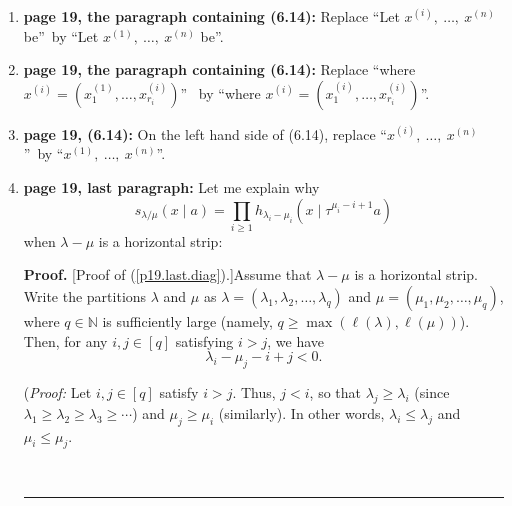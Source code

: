 \documentclass[numbers=enddot,12pt,final,onecolumn,notitlepage]{scrartcl}%
\theoremstyle{definition}
\newenvironment{proof}[1][Proof]{\noindent\textbf{#1.} }{\ \rule{0.5em}{0.5em}}
\let\prodnonlimits\prod
\renewcommand{\prod}{\prodnonlimits\limits}
\begin{document}
\begin{enumerate}
\item \textbf{page 19, the paragraph containing (6.14):} Replace
\textquotedblleft Let $x^{\left(  i\right)  },\ \ldots,\ x^{\left(  n\right)
}$ be\textquotedblright\ by \textquotedblleft Let $x^{\left(  1\right)
},\ \ldots,\ x^{\left(  n\right)  }$ be\textquotedblright.

\item \textbf{page 19, the paragraph containing (6.14):} Replace
\textquotedblleft where $x^{\left(  i\right)  }=\left(  x_{1}^{\left(
1\right)  },\ldots,x_{r_{i}}^{\left(  i\right)  }\right)  $\textquotedblright%
\ by \textquotedblleft where $x^{\left(  i\right)  }=\left(  x_{1}^{\left(
i\right)  },\ldots,x_{r_{i}}^{\left(  i\right)  }\right)  $\textquotedblright.

\item \textbf{page 19, (6.14):} On the left hand side of (6.14), replace
\textquotedblleft$x^{\left(  i\right)  },\ \ldots,\ x^{\left(  n\right)  }%
$\textquotedblright\ by \textquotedblleft$x^{\left(  1\right)  }%
,\ \ldots,\ x^{\left(  n\right)  }$\textquotedblright.

\item \textbf{page 19, last paragraph:} Let me explain why
\begin{equation}
s_{\lambda/\mu}\left(  x\mid a\right)  =\prod_{i\geq1}h_{\lambda_{i}-\mu_{i}%
}\left(  x\mid\tau^{\mu_{i}-i+1}a\right)  \label{p19.last.diag}%
\end{equation}
when $\lambda-\mu$ is a horizontal strip:

\begin{proof}
[Proof of (\ref{p19.last.diag}).]Assume that $\lambda-\mu$ is a horizontal
strip. Write the partitions $\lambda$ and $\mu$ as $\lambda=\left(
\lambda_{1},\lambda_{2},\ldots,\lambda_{q}\right)  $ and $\mu=\left(  \mu
_{1},\mu_{2},\ldots,\mu_{q}\right)  $, where $q\in\mathbb{N}$ is sufficiently
large (namely, $q\geq\max\left(  \ell\left(  \lambda\right)  ,\ell\left(
\mu\right)  \right)  $). Then, for any $i,j\in\left[  q\right]  $ satisfying
$i>j$, we have%
\begin{equation}
\lambda_{i}-\mu_{j}-i+j<0. \label{p19.last.pf.1}%
\end{equation}


(\textit{Proof:} Let $i,j\in\left[  q\right]  $ satisfy $i>j$. Thus, $j<i$, so
that $\lambda_{j}\geq\lambda_{i}$ (since $\lambda_{1}\geq\lambda_{2}%
\geq\lambda_{3}\geq\cdots$) and $\mu_{j}\geq\mu_{i}$ (similarly). In other
words, $\lambda_{i}\leq\lambda_{j}$ and $\mu_{i}\leq\mu_{j}$.


\end{proof}
\end{enumerate}
\end{document}
